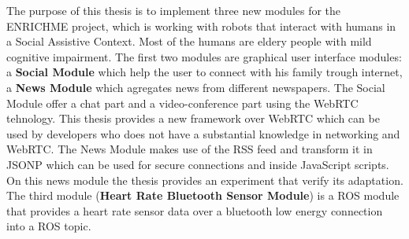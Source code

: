 The purpose of this thesis is to implement three new modules for the ENRICHME project, which is
working with robots that interact with humans in a Social Assistive Context. Most of the humans are
eldery people with mild cognitive impairment.
The first two modules are graphical user interface modules: a \textbf{Social Module} which help
the user to connect with his family trough internet,
a \textbf{News Module} which agregates news from different newspapers.
The Social Module offer a chat part and a video-conference part using the WebRTC tehnology.
This thesis provides a new framework over WebRTC which can be used by developers
who does not have a substantial knowledge in networking and WebRTC.
The News Module makes use of the RSS feed and transform it in JSONP which can be used for
secure connections and inside JavaScript scripts. On this news module the thesis provides an experiment
that verify its adaptation.
The third module (\textbf{Heart Rate Bluetooth Sensor Module}) is a ROS module that provides a heart rate sensor
data over a bluetooth low energy connection into a ROS topic.
